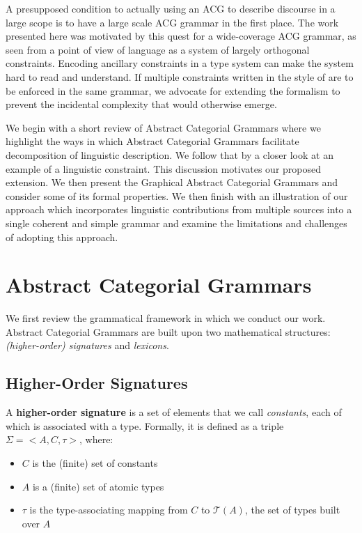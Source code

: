 \documentclass{llncs}
\begin{document}
A presupposed condition to actually using an ACG to describe discourse in a
large scope is to have a large scale ACG grammar in the first place. The work
presented here was motivated by this quest for a wide-coverage ACG grammar, as
seen from a point of view of language as a system of largely orthogonal
constraints. Encoding ancillary constraints in a type system can make the
system hard to read and understand. If multiple constraints written in the
style of \cite{pogodalla2012controlling} are to be enforced in the same
grammar, we advocate for extending the formalism to prevent the incidental
complexity that would otherwise emerge.

We begin with a short review of Abstract Categorial Grammars where we
highlight the ways in which Abstract Categorial Grammars facilitate
decomposition of linguistic description. We follow that by a closer look at an
example of a linguistic constraint. This discussion motivates our proposed
extension. We then present the Graphical Abstract Categorial Grammars and
consider some of its formal properties. We then finish with an illustration of
our approach which incorporates linguistic contributions from multiple sources
into a single coherent and simple grammar and examine the limitations and
challenges of adopting this approach.


\section{Abstract Categorial Grammars}
\label{sec:acg-comp}

We first review the grammatical framework in which we conduct our
work. Abstract Categorial Grammars are built upon two mathematical structures:
\emph{(higher-order) signatures} and \emph{lexicons}.

\subsection{Higher-Order Signatures}
\label{ssec:sig}

A \textbf{higher-order signature} is a set of elements that we call
\emph{constants}, each of which is associated with a type. Formally, it
is defined as a triple $\Sigma = \mathopen{<}A, C, \tau\mathclose{>}$,
where:
\begin{itemize}
  \item $C$ is the (finite) set of constants
  \item $A$ is a (finite) set of atomic types
  \item $\tau$ is the type-associating mapping from $C$ to
    $\mathcal{T}(A)$, the set of types built over $A$
\end{itemize}
\end{document}
